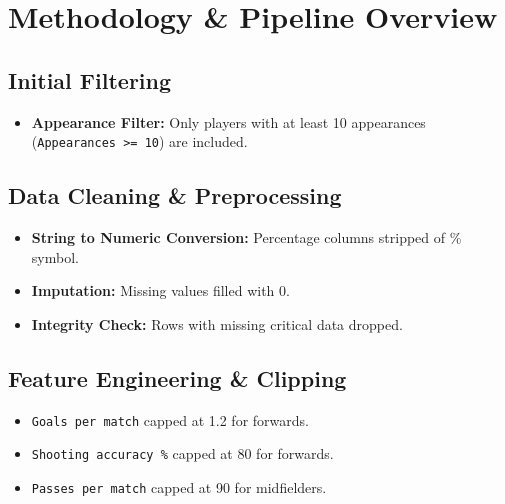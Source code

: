 \documentclass[12pt,a4paper]{article}
\begin{document}
\section{Methodology \& Pipeline Overview}

\subsection{Initial Filtering}
\begin{itemize}
    \item \textbf{Appearance Filter:} Only players with at least 10 appearances (\texttt{Appearances >= 10}) are included.
\end{itemize}

\subsection{Data Cleaning \& Preprocessing}
\begin{itemize}
    \item \textbf{String to Numeric Conversion:} Percentage columns stripped of \% symbol.
    \item \textbf{Imputation:} Missing values filled with 0.
    \item \textbf{Integrity Check:} Rows with missing critical data dropped.
\end{itemize}

\subsection{Feature Engineering \& Clipping}
\begin{itemize}
    \item \texttt{Goals per match} capped at 1.2 for forwards.
    \item \texttt{Shooting accuracy \%} capped at 80 for forwards.
    \item \texttt{Passes per match} capped at 90 for midfielders.
\end{itemize}
\end{document}
